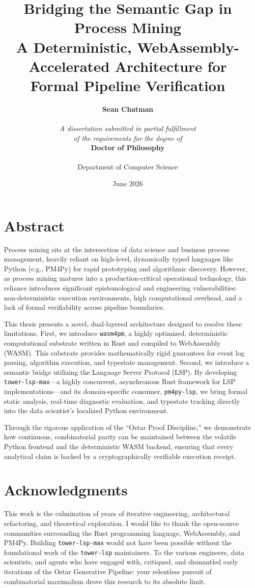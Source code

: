 \documentclass[11pt,twoside,openright]{book}
\title{
    \vspace{2cm}
    \Huge \textbf{Bridging the Semantic Gap in Process Mining} \\
    \vspace{1cm}
    \Large A Deterministic, WebAssembly-Accelerated Architecture for Formal Pipeline Verification
    \vspace{2cm}
}
\author{
    \Large \textbf{Sean Chatman} \\
    \vspace{0.5cm} \\
    \textit{A dissertation submitted in partial fulfillment} \\
    \textit{of the requirements for the degree of} \\
    \textbf{Doctor of Philosophy} \\
    \vspace{0.5cm} \\
    Department of Computer Science \\
    \vspace{2cm}
}
\date{June 2026}
\begin{document}
\frontmatter
\maketitle

\chapter*{Abstract}
Process mining sits at the intersection of data science and business process management, heavily reliant on high-level, dynamically typed languages like Python (e.g., PM4Py) for rapid prototyping and algorithmic discovery. However, as process mining matures into a production-critical operational technology, this reliance introduces significant epistemological and engineering vulnerabilities: non-deterministic execution environments, high computational overhead, and a lack of formal verifiability across pipeline boundaries. 

This thesis presents a novel, dual-layered architecture designed to resolve these limitations. First, we introduce \texttt{wasm4pm}, a highly optimized, deterministic computational substrate written in Rust and compiled to WebAssembly (WASM). This substrate provides mathematically rigid guarantees for event log parsing, algorithm execution, and typestate management. Second, we introduce a semantic bridge utilizing the Language Server Protocol (LSP). By developing \texttt{tower-lsp-max}---a highly concurrent, asynchronous Rust framework for LSP implementations---and its domain-specific consumer, \texttt{pm4py-lsp}, we bring formal static analysis, real-time diagnostic evaluation, and typestate tracking directly into the data scientist's localized Python environment. 

Through the rigorous application of the ``Ostar Proof Discipline,'' we demonstrate how continuous, combinatorial parity can be maintained between the volatile Python frontend and the deterministic WASM backend, ensuring that every analytical claim is backed by a cryptographically verifiable execution receipt.

\chapter*{Acknowledgments}
This work is the culmination of years of iterative engineering, architectural refactoring, and theoretical exploration. I would like to thank the open-source communities surrounding the Rust programming language, WebAssembly, and PM4Py. Building \texttt{tower-lsp-max} would not have been possible without the foundational work of the \texttt{tower-lsp} maintainers. To the various engineers, data scientists, and agents who have engaged with, critiqued, and dismantled early iterations of the Ostar Generative Pipeline: your relentless pursuit of combinatorial maximalism drove this research to its absolute limit.
\end{document}

